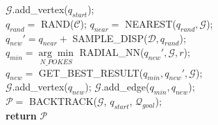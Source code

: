 \begin{algorithm}\footnotesize
\caption{PokeRRT*}\label{poke:algo:pokerrt*}
  $\mathcal{G}.$add\_vertex($q_{start}$);\\
   {
      $q_{rand} =$ RAND($\mathcal{C}$); $q_{near} =$ NEAREST($q_{rand}, \mathcal{G}$);\\
      $q_{new}' = q_{near} + $ SAMPLE\_DISP($\mathcal{D}, q_{rand}$);\\
      $q_{min} = \underset{N\_POKES}{\arg\min}$ RADIAL\_NN($q_{new}', \mathcal{G}, r$);\\
      \vspace{4pt}
      $q_{new} =$ GET\_BEST\_RESULT($q_{min}, q_{new}', \mathcal{G}$);\\
      $\mathcal{G}.$add\_vertex($q_{new}$); $\mathcal{G}.$add\_edge($q_{min}, q_{new}$);\\
  }
$\mathcal{P} = $ BACKTRACK($\mathcal{G}$, $q_{start}$, $\mathcal{Q}_{goal}$);\\
\textbf{return} $\mathcal{P}$
\end{algorithm}

